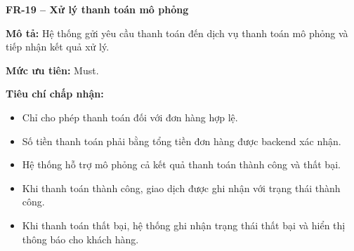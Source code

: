 \documentclass[a4paper]{article}
\begin{document}
\par\ifdim\dimexpr\pagegoal-\pagetotal\relax<6\baselineskip\newpage\fi
{}

\noindent\textbf{FR-19 – Xử lý thanh toán mô phỏng}\par\nopagebreak
\begin{list}{}{%
    \setlength{\leftmargin}{0.8cm}%
    \setlength{\rightmargin}{0pt}%
    \setlength{\labelwidth}{0pt}%
    \setlength{\labelsep}{0pt}%
    \setlength{\itemindent}{0pt}%
    \setlength{\listparindent}{0pt}%
    \setlength{\itemsep}{5pt}%
    \setlength{\parsep}{0pt}%
    \setlength{\topsep}{5pt}%
}
\item[] \textbf{Mô tả:} Hệ thống gửi yêu cầu thanh toán đến dịch vụ thanh toán mô phỏng và tiếp nhận kết quả xử lý.
\item[] \textbf{Mức ưu tiên:} Must.
\item[] \textbf{Tiêu chí chấp nhận:} 
\begin{itemize}
\item Chỉ cho phép thanh toán đối với đơn hàng hợp lệ.
\item Số tiền thanh toán phải bằng tổng tiền đơn hàng được backend xác nhận.
\item Hệ thống hỗ trợ mô phỏng cả kết quả thanh toán thành công và thất bại.
\item Khi thanh toán thành công, giao dịch được ghi nhận với trạng thái thành công.
\item Khi thanh toán thất bại, hệ thống ghi nhận trạng thái thất bại và hiển thị thông báo cho khách hàng.
\end{itemize}
\end{list}

\par\ifdim\dimexpr\pagegoal-\pagetotal\relax<6\baselineskip\newpage\fi
{}
\end{document}
